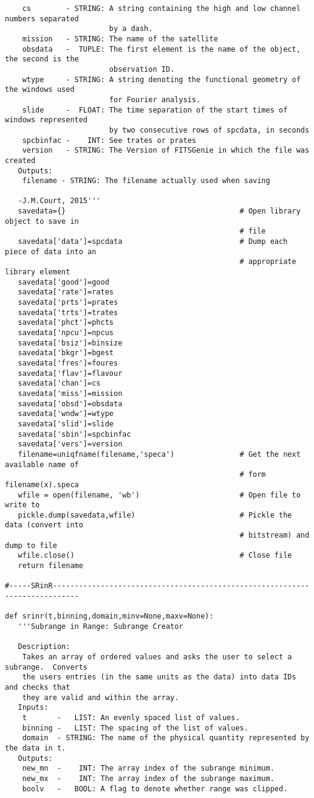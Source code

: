 \begin{verbatim}
    cs        - STRING: A string containing the high and low channel numbers separated
                        by a dash.
    mission   - STRING: The name of the satellite
    obsdata   -  TUPLE: The first element is the name of the object, the second is the
                        observation ID.
    wtype     - STRING: A string denoting the functional geometry of the windows used
                        for Fourier analysis.
    slide     -  FLOAT: The time separation of the start times of windows represented
                        by two consecutive rows of spcdata, in seconds
    spcbinfac -    INT: See trates or prates
    version   - STRING: The Version of FITSGenie in which the file was created
   Outputs:
    filename - STRING: The filename actually used when saving

   -J.M.Court, 2015'''
   savedata={}                                        # Open library object to save in
                                                      # file
   savedata['data']=spcdata                           # Dump each piece of data into an
                                                      # appropriate library element
   savedata['good']=good
   savedata['rate']=rates
   savedata['prts']=prates
   savedata['trts']=trates
   savedata['phct']=phcts
   savedata['npcu']=npcus
   savedata['bsiz']=binsize
   savedata['bkgr']=bgest
   savedata['fres']=foures
   savedata['flav']=flavour
   savedata['chan']=cs
   savedata['miss']=mission
   savedata['obsd']=obsdata
   savedata['wndw']=wtype
   savedata['slid']=slide
   savedata['sbin']=spcbinfac
   savedata['vers']=version
   filename=uniqfname(filename,'speca')               # Get the next available name of
                                                      # form filename(x).speca
   wfile = open(filename, 'wb')                       # Open file to write to
   pickle.dump(savedata,wfile)                        # Pickle the data (convert into 
                                                      # bitstream) and dump to file
   wfile.close()                                      # Close file
   return filename

#-----SRinR----------------------------------------------------------------------------

def srinr(t,binning,domain,minv=None,maxv=None):
   '''Subrange in Range: Subrange Creator

   Description:
    Takes an array of ordered values and asks the user to select a subrange.  Converts
    the users entries (in the same units as the data) into data IDs and checks that
    they are valid and within the array.
   Inputs:
    t       -   LIST: An evenly spaced list of values.
    binning -   LIST: The spacing of the list of values.
    domain  - STRING: The name of the physical quantity represented by the data in t.
   Outputs:
    new_mn  -    INT: The array index of the subrange minimum.
    new_mx  -    INT: The array index of the subrange maximum.
    boolv   -   BOOL: A flag to denote whether range was clipped.


\end{verbatim}
